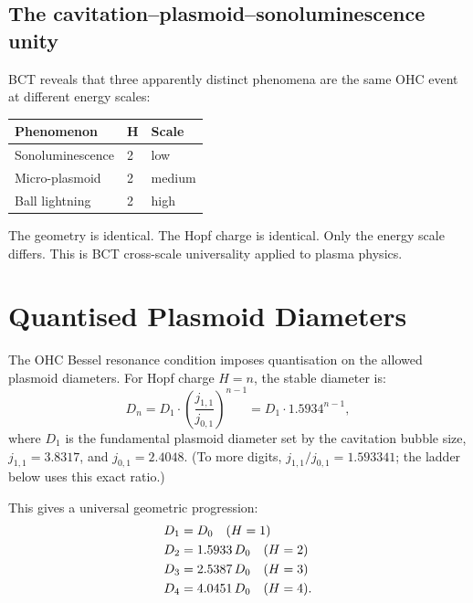 \documentclass[12pt,twocolumn]{article}
\begin{document}
\subsection{The cavitation--plasmoid--sonoluminescence unity}

BCT reveals that three apparently distinct phenomena are the
same OHC event at different energy scales:

\begin{center}
{\footnotesize
\begin{tabular}{@{}lll@{}}
\toprule
Phenomenon & H & Scale \\
\midrule
Sonoluminescence & 2 & low \\
Micro-plasmoid & 2 & medium \\
Ball lightning & 2 & high \\
\bottomrule
\end{tabular}}
\end{center}

\medskip
The geometry is identical. The Hopf charge is identical. Only
the energy scale differs. This is BCT cross-scale universality
applied to plasma physics.

\section{Quantised Plasmoid Diameters}

The OHC Bessel resonance condition imposes quantisation on
the allowed plasmoid diameters. For Hopf charge $H = n$,
the stable diameter is:
\begin{equation}
  D_n = D_1 \cdot \left(\frac{j_{1,1}}{j_{0,1}}\right)^{n-1}
  = D_1 \cdot 1.5934^{n-1},
\end{equation}
where $D_1$ is the fundamental plasmoid diameter set by the
cavitation bubble size, $j_{1,1} = 3.8317$, and
$j_{0,1} = 2.4048$. (To more digits,
$j_{1,1}/j_{0,1} = 1.593341$; the ladder below uses this
exact ratio.)

This gives a universal geometric progression:
\begin{align}
  D_1 &= D_0 \quad (H=1) \notag \\
  D_2 &= 1.5933\,D_0 \quad (H=2) \notag \\
  D_3 &= 2.5387\,D_0 \quad (H=3) \notag \\
  D_4 &= 4.0451\,D_0 \quad (H=4). \notag
\end{align}
\end{document}

